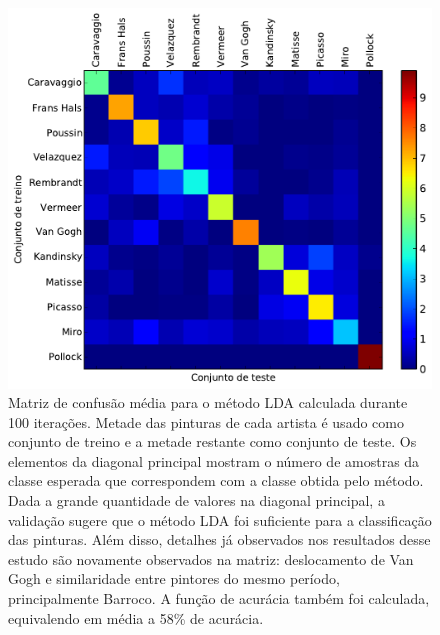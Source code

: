 \begin{figure}[h!]
\begin{center}
        \includegraphics[width=\columnwidth]{figs/matriz_confusao}
      \caption{Matriz de confusão média para o método LDA calculada
        durante 100 iterações. Metade das pinturas de cada artista é
        usado como conjunto de treino e a metade restante como
        conjunto de teste. Os elementos da diagonal principal mostram
        o número de amostras da classe esperada que correspondem com a
        classe obtida pelo método. Dada a grande quantidade de valores
        na diagonal principal, a validação sugere que o método LDA foi
        suficiente para a classificação das pinturas. Além disso,
        detalhes já observados nos resultados desse estudo são
        novamente observados na matriz: deslocamento de Van Gogh e
        similaridade entre pintores do mesmo período, principalmente
        Barroco. A função de acurácia também foi calculada,
        equivalendo em média a 58\% de acurácia.}
        \label{fig:cm}
\end{center}
\end{figure}




